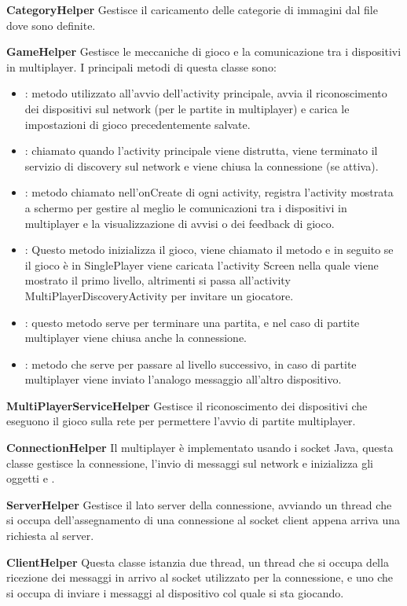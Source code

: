 \begin{description}
\item \textbf{CategoryHelper} Gestisce il caricamento delle categorie di immagini dal file  dove sono definite.
\item \textbf{GameHelper} Gestisce le meccaniche di gioco e la comunicazione tra i dispositivi in multiplayer. I principali metodi di questa classe sono:
\begin{itemize}
\item {}: metodo utilizzato all'avvio dell'activity principale, avvia il riconoscimento dei dispositivi sul network (per le partite in multiplayer) e carica le impostazioni di gioco precedentemente salvate.
\item {}: chiamato quando l'activity principale viene distrutta, viene terminato il servizio di discovery sul network e viene chiusa la connessione (se attiva).
\item {}: metodo chiamato nell'onCreate di ogni activity, registra l'activity mostrata a schermo per gestire al meglio le comunicazioni tra i dispositivi in multiplayer e la visualizzazione di avvisi o dei feedback di gioco.
\item {}: Questo metodo inizializza il gioco, viene chiamato il metodo  e in seguito se il gioco \`{e} in SinglePlayer viene caricata l'activity Screen nella quale viene mostrato il primo livello, altrimenti si passa all'activity MultiPlayerDiscoveryActivity per invitare un giocatore.
\item {}: questo metodo serve per terminare una partita, e nel caso di partite multiplayer viene chiusa anche la connessione.
\item {}: metodo che serve per passare al livello successivo, in caso di partite multiplayer viene inviato l'analogo messaggio all'altro dispositivo.
\end{itemize}
\item \textbf{MultiPlayerServiceHelper} Gestisce il riconoscimento dei dispositivi che eseguono il gioco sulla rete per permettere l'avvio di partite multiplayer.
\item \textbf{ConnectionHelper} Il multiplayer \`{e} implementato usando i socket Java, questa classe gestisce la connessione, l'invio di messaggi sul network e inizializza gli oggetti  e .
\item \textbf{ServerHelper} Gestisce il lato server della connessione, avviando un  thread che si occupa dell'assegnamento di una connessione al socket client appena arriva una richiesta al server.
\item \textbf{ClientHelper} Questa classe istanzia due thread, un thread che si occupa della ricezione dei messaggi in arrivo al socket utilizzato per la connessione, e uno che si occupa di inviare i messaggi al dispositivo col quale si sta giocando.
\end{description}

